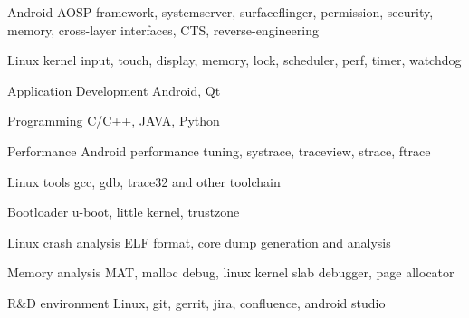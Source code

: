 

\begin{cvskills}

  \cvskill
    {Android AOSP}
    {framework, systemserver, surfaceflinger, permission, security, memory, cross-layer interfaces, CTS, reverse-engineering}

  \cvskill
    {Linux kernel}
    {input, touch, display, memory, lock, scheduler, perf, timer, watchdog}

  \cvskill
    {Application Development}
    {Android, Qt}

  \cvskill
    {Programming} %
    {C/C++, JAVA, Python} %

  \cvskill
    {Performance} %
    {Android performance tuning, systrace, traceview, strace, ftrace} %

  \cvskill
    {Linux tools} %
    {gcc, gdb, trace32 and other toolchain} %

  \cvskill
    {Bootloader}
    {u-boot, little kernel, trustzone}

  \cvskill
    {Linux crash analysis}
    {ELF format, core dump generation and analysis}

    \cvskill
    {Memory analysis}
    {MAT, malloc debug, linux kernel slab debugger, page allocator}

  \cvskill
    {R\&D environment}
    {Linux, git, gerrit, jira, confluence, android studio}

\end{cvskills}
